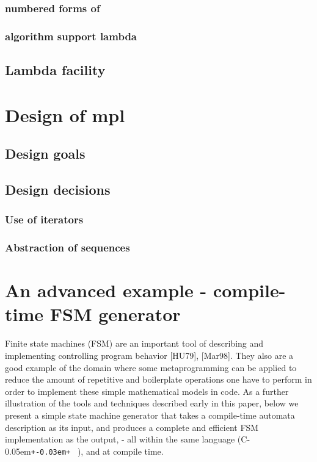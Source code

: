 \documentclass{netobjectdays}
\newcommand{\Cpp}{C\kern-0.05em\texttt{+\kern-0.03em+}%
}
\newcommand{\mping}{meta\-program\-ming}
\begin{document}
  \subsubsection{numbered forms of }
  \subsubsection{algorithm support lambda}


\subsection{Lambda facility}

\section{Design of mpl}
\subsection{Design goals}
\subsection{Design decisions}
\subsubsection{Use of iterators}
\subsubsection{Abstraction of sequences}

\section{An advanced example - compile-time FSM generator}

Finite state machines (FSM) are an important tool of 
describing and implementing controlling program behavior 
[HU79], [Mar98]. They also are a good example of the domain 
where some \mping{} can be applied to reduce the amount of 
repetitive and boilerplate operations one have to perform 
in order to implement these simple mathematical models in 
code. As a further illustration of the tools and techniques 
described early in this paper, below we present a simple 
state machine generator that takes a compile-time automata 
description as its input, and produces a complete and 
efficient FSM implementation as the output, - all within 
the same language (\Cpp\ ), and at compile time.
\end{document}
